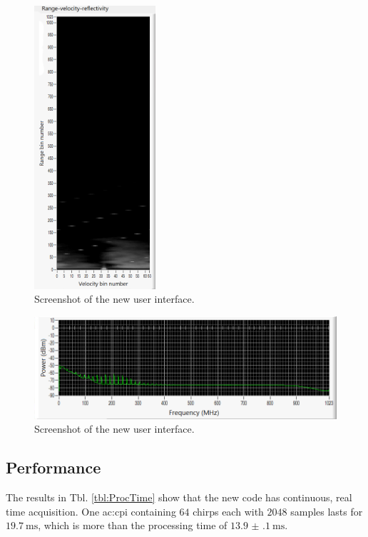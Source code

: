 \documentclass{article}
\begin{document}
\begin{figure}
	\centering
	\includegraphics[width=0.4\textwidth]{working-heavy-rain-sleet_range-doppler}
	\caption{Screenshot of the new user interface.}
	\label{fig:WorkingHeavyRainSnowRangeDoppler}
\end{figure}

\begin{figure}
	\centering
	\includegraphics[width=\textwidth]{working-heavy-rain-sleet_power-spect}
	\caption{Screenshot of the new user interface.}
	\label{fig:WorkingHeavyRainSnowPowerSpectrum}
\end{figure}

\subsection{Performance}
The results in Tbl. \ref{tbl:ProcTime} show that the new code has continuous, real time acquisition. One \acrshort{ac:cpi} containing \(64\) chirps each with \(2048\) samples lasts for \(\SI{19.7}{\milli\second}\), which is more than the processing time of \(\SI{13.9(1)}{\milli\second}\).
\end{document}
